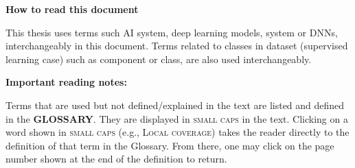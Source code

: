 
\begin{center}
{\fontsize{16}{15} \bf How to read this document}
\vspace{0.4cm}
\end{center}
\normalsize

This thesis uses terms such AI system, deep learning models, system or DNNs, interchangeably in this document. Terms related to classes in dataset (supervised learning case) such as component or class, are also used interchangeably.

\textbf{Important reading notes:}

     Terms that are used but not defined/explained in the text are listed and defined in the \textbf{GLOSSARY}. They are displayed in \textsc{small caps} in the text. Clicking on a word shown in \textsc{small caps} (e.g., \textsc{Local coverage}) takes the reader directly to the definition of that term in the Glossary. From there, one may click on the page number shown at the end of the definition to return.



\clearpage

